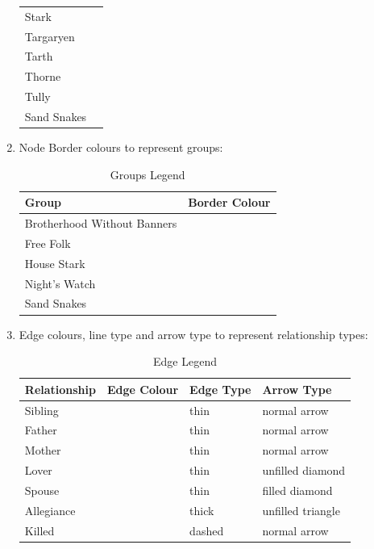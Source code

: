 \documentclass[twoside]{article}
\theoremstyle{definition}
\theoremstyle{definition}
\begin{document}
\begin{enumerate}
\begin{table}[h!]
\begin{tabular}{ll}
Stark       & \cellcolor[HTML]{CCDEFF} \\
Targaryen   & \cellcolor[HTML]{FF0099} \\
Tarth       & \cellcolor[HTML]{33CCCC} \\
Thorne      & \cellcolor[HTML]{FFCC99} \\
Tully       & \cellcolor[HTML]{0000FF} \\
Sand Snakes & \cellcolor[HTML]{666600}
\end{tabular}
\end{table}
\item Node Border colours to represent groups:
	\begin{table}[h!]
		\centering
		\caption{Groups Legend}
			\begin{tabular}{ll}
			Group                       & Border Colour            \\ \hline
		Brotherhood Without Banners & \cellcolor[HTML]{00FFFF} \\
	Free Folk                   & \cellcolor[HTML]{FF3300} \\
House Stark                 & \cellcolor[HTML]{CCDEFF} \\
Night's Watch               & \cellcolor[HTML]{339966} \\
Sand Snakes                 & \cellcolor[HTML]{666600}
\end{tabular}
\end{table}


	\item Edge colours, line type and arrow type  to represent relationship types:
		\begin{table}[h!]
			\centering
			\caption{Edge Legend}
			\begin{tabular}{llll}
			Relationship & Edge Colour              & Edge Type & Arrow Type        \\ \hline
		Sibling      & \cellcolor[HTML]{00FF00} & thin      & normal arrow      \\
	Father       & \cellcolor[HTML]{0000FF} & thin      & normal arrow      \\
Mother       & \cellcolor[HTML]{FF0000} & thin      & normal arrow      \\
Lover        & \cellcolor[HTML]{FF6600} & thin      & unfilled diamond  \\
Spouse       & \cellcolor[HTML]{FF6600} & thin      & filled diamond    \\
Allegiance   & \cellcolor[HTML]{000000} & thick     & unfilled triangle \\
Killed       & \cellcolor[HTML]{000000} & dashed    & normal arrow     
\end{tabular}
\end{table}
\end{enumerate}
\end{document}
